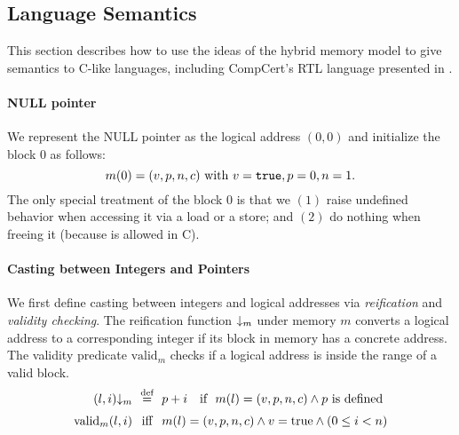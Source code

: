 



\subsection{Language Semantics}
\label{sec:intptrcast:formal-semantics:langsem}

This section describes how to use the ideas of the hybrid memory model to give semantics to C-like
languages, including CompCert's RTL language presented in .


\paragraph{NULL pointer} 
We represent the NULL pointer as the logical address $(0,0)$ and 
initialize the block $0$ as follows:
\[
m(0) = (v,p,n,c) \text{ with } v=\texttt{true}, p=0, n=1.
\]
The only special treatment of the block $0$ is that we $(1)$ raise
undefined behavior when accessing it via a load or a store;
and $(2)$ do nothing when freeing it (because  is allowed in C).


\paragraph{Casting between Integers and Pointers}

We first define casting between integers and logical addresses via \emph{reification} and \emph{validity checking}.
The reification function ${{}{\downarrow_{m}}}$ under memory $m$
converts a logical address to a corresponding integer if its block in memory has a concrete address.
The validity predicate $\text{valid}_m$ checks if a logical address
is inside the range of a valid block.
\[
\begin{array}{@{}r@{~~}c@{~~}ll@{}}
\toint{(l, i)}{m} &\defeq& p + i &\text{if }~ m(l) = (v, p, n, c) \land p\text{ is defined} \\[2mm]
\text{valid}_m(l,i) &\text{iff}& 
\multicolumn{2}{@{}l@{}}{
m(l) = (v, p, n, c) \land v=\mathrm{true} \land (0\le i < n)}
\\
\end{array}
\]

